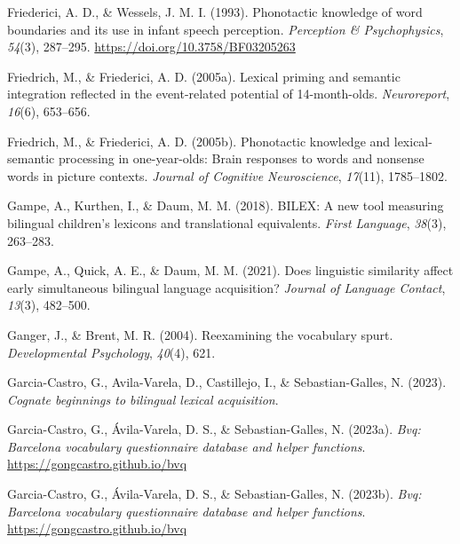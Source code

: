 \documentclass[
  12pt,
  b5paperpaper,
  twoside]{scrreprt}
\newlength{\cslhangindent}
\newlength{\cslentryspacingunit} %
\newenvironment{CSLReferences}[2] %
 {%
  \setlength{\parindent}{0pt}
  \ifodd #1
  \let\oldpar\par
  \def\par{\hangindent=\cslhangindent\oldpar}
  \fi
  \setlength{\parskip}{#2\cslentryspacingunit}
 }%
 {}
\begin{document}
\begin{CSLReferences}{1}{0}
\leavevmode{}%
Friederici, A. D., \& Wessels, J. M. I. (1993). Phonotactic knowledge of
word boundaries and its use in infant speech perception.
\emph{Perception \& Psychophysics}, \emph{54}(3), 287--295.
\url{https://doi.org/10.3758/BF03205263}

\leavevmode{}%
Friedrich, M., \& Friederici, A. D. (2005a). Lexical priming and
semantic integration reflected in the event-related potential of
14-month-olds. \emph{Neuroreport}, \emph{16}(6), 653--656.

\leavevmode{}%
Friedrich, M., \& Friederici, A. D. (2005b). Phonotactic knowledge and
lexical-semantic processing in one-year-olds: Brain responses to words
and nonsense words in picture contexts. \emph{Journal of Cognitive
Neuroscience}, \emph{17}(11), 1785--1802.

\leavevmode{}%
Gampe, A., Kurthen, I., \& Daum, M. M. (2018). BILEX: A new tool
measuring bilingual children's lexicons and translational equivalents.
\emph{First Language}, \emph{38}(3), 263--283.

\leavevmode{}%
Gampe, A., Quick, A. E., \& Daum, M. M. (2021). Does linguistic
similarity affect early simultaneous bilingual language acquisition?
\emph{Journal of Language Contact}, \emph{13}(3), 482--500.

\leavevmode{}%
Ganger, J., \& Brent, M. R. (2004). Reexamining the vocabulary spurt.
\emph{Developmental Psychology}, \emph{40}(4), 621.

\leavevmode{}%
Garcia-Castro, G., Avila-Varela, D., Castillejo, I., \&
Sebastian-Galles, N. (2023). \emph{Cognate beginnings to bilingual
lexical acquisition}.

\leavevmode{}%
Garcia-Castro, G., Ávila-Varela, D. S., \& Sebastian-Galles, N. (2023a).
\emph{Bvq: Barcelona vocabulary questionnaire database and helper
functions}. \url{https://gongcastro.github.io/bvq}

\leavevmode{}%
Garcia-Castro, G., Ávila-Varela, D. S., \& Sebastian-Galles, N. (2023b).
\emph{Bvq: Barcelona vocabulary questionnaire database and helper
functions}. \url{https://gongcastro.github.io/bvq}


\end{CSLReferences}
\end{document}
